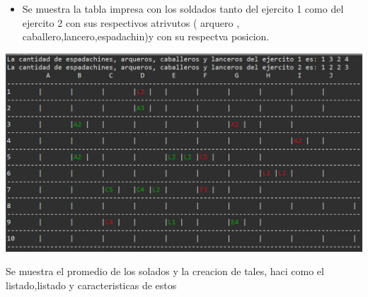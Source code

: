 \documentclass{article}
\begin{document}
	\begin{itemize}	
		\item Se muestra la tabla impresa con los soldados tanto del ejercito 1 como del ejercito 2 con sus respectivos atrivutos ( arquero , caballero,lancero,espadachin)y con su respectva posicion.
	\end{itemize}
	\includegraphics[scale=0.35]{img/captura1.jpeg} 	

		 
		\item Se muestra el promedio de los solados y la creacion de tales, haci como el listado,listado y caracteristicas de estos
	
\end{document}

